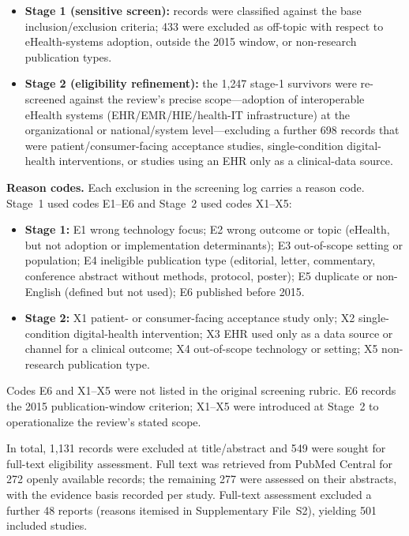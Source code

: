 \begin{itemize}
\item \textbf{Stage 1 (sensitive screen):} records were classified against the
  base inclusion/exclusion criteria; 433 were excluded as off-topic with respect
  to eHealth-systems adoption, outside the 2015 window, or non-research
  publication types.
\item \textbf{Stage 2 (eligibility refinement):} the 1{,}247 stage-1 survivors
  were re-screened against the review's precise scope---adoption of interoperable
  eHealth systems (EHR/EMR/HIE/health-IT infrastructure) at the organizational or
  national/system level---excluding a further 698 records that were
  patient/consumer-facing acceptance studies, single-condition digital-health
  interventions, or studies using an EHR only as a clinical-data source.
\end{itemize}

\noindent\textbf{Reason codes.} Each exclusion in the screening log carries a
reason code. Stage~1 used codes E1--E6 and Stage~2 used codes X1--X5:
\begin{itemize}
\item \textbf{Stage 1:} E1 wrong technology focus; E2 wrong outcome or topic
  (eHealth, but not adoption or implementation determinants); E3 out-of-scope
  setting or population; E4 ineligible publication type (editorial, letter,
  commentary, conference abstract without methods, protocol, poster); E5
  duplicate or non-English (defined but not used); E6 published before 2015.
\item \textbf{Stage 2:} X1 patient- or consumer-facing acceptance study only;
  X2 single-condition digital-health intervention; X3 EHR used only as a data
  source or channel for a clinical outcome; X4 out-of-scope technology or
  setting; X5 non-research publication type.
\end{itemize}
\noindent Codes E6 and X1--X5 were not listed in the original screening rubric.
E6 records the 2015 publication-window criterion; X1--X5 were introduced at
Stage~2 to operationalize the review's stated scope.

\noindent In total, 1{,}131 records were excluded at title/abstract and 549 were
sought for full-text eligibility assessment. Full text was retrieved from PubMed
Central for 272 openly available records; the remaining 277 were assessed on their
abstracts, with the evidence basis recorded per study. Full-text assessment
excluded a further 48 reports (reasons itemised in Supplementary File~S2),
yielding 501 included studies.

